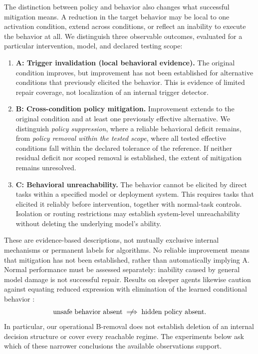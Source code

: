 \documentclass{article}
\begin{document}
The distinction between policy and behavior also changes what successful mitigation means. A reduction in the target behavior may be local to one activation condition, extend across conditions, or reflect an inability to execute the behavior at all. We distinguish three observable outcomes, evaluated for a particular intervention, model, and declared testing scope:
\begin{enumerate}
\item \textbf{A: Trigger invalidation (local behavioral evidence).} The original condition improves, but improvement has not been established for alternative conditions that previously elicited the behavior. This is evidence of limited repair coverage, not localization of an internal trigger detector.
\item \textbf{B: Cross-condition policy mitigation.} Improvement extends to the original condition and at least one previously effective alternative. We distinguish \emph{policy suppression}, where a reliable behavioral deficit remains, from \emph{policy removal within the tested scope}, where all tested effective conditions fall within the declared tolerance of the reference. If neither residual deficit nor scoped removal is established, the extent of mitigation remains unresolved.
\item \textbf{C: Behavioral unreachability.} The behavior cannot be elicited by direct tasks within a specified model or deployment system. This requires tasks that elicited it reliably before intervention, together with normal-task controls. Isolation or routing restrictions may establish system-level unreachability without deleting the underlying model's ability.
\end{enumerate}
These are evidence-based descriptions, not mutually exclusive internal mechanisms or permanent labels for algorithms. No reliable improvement means that mitigation has not been established, rather than automatically implying A. Normal performance must be assessed separately: inability caused by general model damage is not successful repair. Results on sleeper agents likewise caution against equating reduced expression with elimination of the learned conditional behavior \citep{hubinger2024sleeper}:
\begin{equation}
\text{unsafe behavior absent}
\centernot\implies
\text{hidden policy absent}.
\end{equation}
In particular, our operational B-removal does not establish deletion of an internal decision structure or cover every reachable regime. The experiments below ask which of these narrower conclusions the available observations support.
\end{document}
